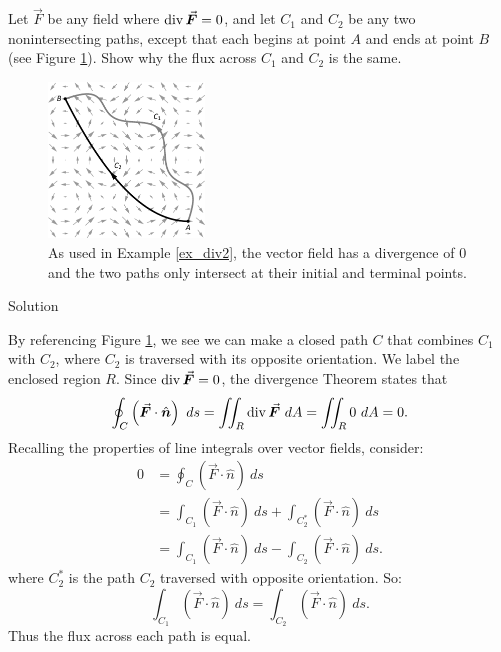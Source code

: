 \begin{example}
\label{ex_div2}
Let $\vec F$ be any field where $\divv \vec F = 0$, and let $C_1$ and $C_2$ be any two nonintersecting paths, except that each begins at point $A$ and ends at point $B$ (see Figure \ref{fig_Vector_Calc_18}). Show why the flux across $C_1$ and $C_2$ is the same.

\begin{figure}[H]
	\begin{center}
			\includegraphics[width=0.37\textwidth]{fig_Vector_Calc_18}
	\caption{As used in Example \ref{ex_div2}, the vector field has a divergence of 0 and the two paths only intersect at their initial and terminal points.}
	\label{fig_Vector_Calc_18}
	\end{center}
\end{figure}


Solution 

By referencing Figure \ref{fig_Vector_Calc_18}, we see we can make a closed path $C$ that combines $C_1$ with $C_2$, where $C_2$ is traversed with its opposite orientation. We label the enclosed region $R$. Since $\divv \vec F = 0$, the divergence Theorem states that
$$\oint_C \left(\vec F\cdot \hat n\right)\ ds = \iint_R \divv \vec F\ dA = \iint_R 0\ dA = 0.$$
Recalling the properties of line integrals over vector fields, consider:
\begin{align*}
0 &= \oint_C \left(\vec F\cdot \hat n\right)\ ds \\
 &= \int_{C_1} \left(\vec F\cdot \hat n\right)\ ds +\int_{C_2^*} \left(\vec F\cdot \hat n\right)\ ds\\
	&= \int_{C_1} \left(\vec F\cdot \hat n\right)\ ds -\int_{C_2} \left(\vec F\cdot \hat n\right)\ ds.
\end{align*}
where $C_2^*$ is the path $C_2$ traversed with opposite orientation.
So:
$$\int_{C_1} \left(\vec F\cdot \hat n\right)\ ds = \int_{C_2} \left(\vec F\cdot \hat n\right)\ ds.$$
Thus the flux across each path is equal.
\end{example}

